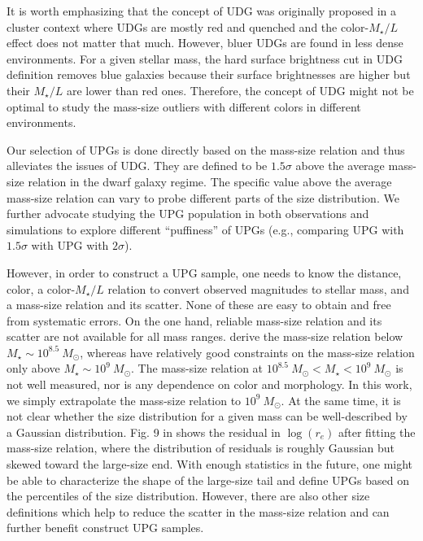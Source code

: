 \documentclass[twocolumn,astrosymb,twocolappendix]{aastex631}
\begin{document}
\begin{CJK*}{UTF8}{gbsn}
It is worth emphasizing that the concept of UDG was originally proposed in a cluster context where UDGs are mostly red and quenched \citep[e.g.,][]{vanDokkum2015} and the color-$M_\star/L$ effect does not matter that much. However, bluer UDGs are found in less dense environments. For a given stellar mass, the hard surface brightness cut in UDG definition removes blue galaxies because their surface brightnesses are higher but their $M_\star/L$ are lower than red ones. Therefore, the concept of UDG might not be optimal to study the mass-size outliers with different colors in different environments.

Our selection of UPGs is done directly based on the mass-size relation and thus alleviates the issues of UDG. They are defined to be $1.5\sigma$ above the average mass-size relation in the dwarf galaxy regime. The specific value above the average mass-size relation can vary to probe different parts of the size distribution. We further advocate studying the UPG population in both observations and simulations to explore different ``puffiness'' of UPGs (e.g., comparing UPG with $1.5\sigma$ with UPG with $2\sigma$). 

However, in order to construct a UPG sample, one needs to know the distance, color, a color-$M_\star/L$ relation to convert observed magnitudes to stellar mass, and a mass-size relation and its scatter. None of these are easy to obtain and free from systematic errors. On the one hand, reliable mass-size relation and its scatter are not available for all mass ranges. \citet{ELVES-I} derive the mass-size relation below $M_\star \sim 10^{8.5}\ M_\odot$, whereas \citet{Lange2015} have relatively good constraints on the mass-size relation only above $M_\star \sim 10^{9}\ M_\odot$. The mass-size relation at $10^{8.5}\ M_\odot < M_\star < 10^{9}\ M_\odot$ is not well measured, nor is any dependence on color and morphology. In this work, we simply extrapolate the \citet{ELVES-I} mass-size relation to $10^9\ M_\odot$. At the same time, it is not clear whether the size distribution for a given mass can be well-described by a Gaussian distribution. Fig. 9 in \citet{ELVES-I} shows the residual in $\log(r_e)$ after fitting the mass-size relation, where the distribution of residuals is roughly Gaussian but skewed toward the large-size end. With enough statistics in the future, one might be able to characterize the shape of the large-size tail and define UPGs based on the percentiles of the size distribution. However, there are also other size definitions which help to reduce the scatter in the mass-size relation \citep[e.g.,][]{Miller2019,Mowla2019,Trujillo2020} and can further benefit construct UPG samples.


\end{CJK*}
\end{document}
